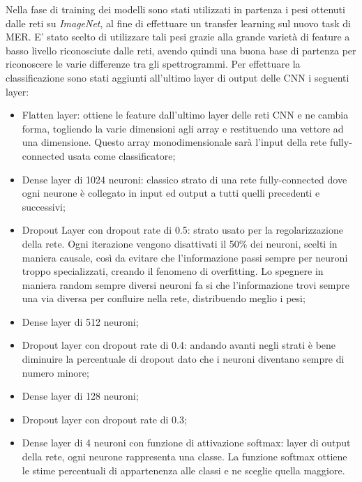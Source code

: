 \documentclass[11pt]{report}
\begin{document}
Nella fase di training dei modelli sono stati utilizzati in partenza i pesi ottenuti dalle reti su \textit{ImageNet}, al fine di effettuare un transfer learning sul nuovo task di MER. E' stato scelto di utilizzare tali pesi grazie alla grande varietà di feature a basso livello riconosciute dalle reti, avendo quindi una buona base di partenza per riconoscere le varie differenze tra gli spettrogrammi. Per effettuare la classificazione sono stati aggiunti all'ultimo layer di output delle CNN i seguenti layer:
\begin{itemize}
    \item Flatten layer: ottiene le feature dall'ultimo layer delle reti CNN e ne cambia forma, togliendo la varie dimensioni agli array e restituendo una vettore ad una dimensione. Questo array monodimensionale sarà l'input della rete fully-connected usata come classificatore;
    
    \item Dense layer di 1024 neuroni: classico strato di una rete fully-connected dove ogni neurone è collegato in input ed output a tutti quelli precedenti e successivi;
    
    \item Dropout Layer con dropout rate di 0.5: strato usato per la regolarizzazione della rete. Ogni iterazione vengono disattivati il 50\% dei neuroni, scelti in maniera causale, così da evitare che l'informazione passi sempre per neuroni troppo specializzati, creando il fenomeno di overfitting. Lo spegnere in maniera random sempre diversi neuroni fa si che l'informazione trovi sempre una via diversa per confluire nella rete, distribuendo meglio i pesi;

    \item Dense layer di 512 neuroni;
    
    \item Dropout layer con dropout rate di 0.4: andando avanti negli strati è bene diminuire la percentuale di dropout dato che i neuroni diventano sempre di numero minore;
    
    \item Dense layer di 128 neuroni;
    
    \item Dropout layer con dropout rate di 0.3;
    
    \item Dense layer di 4 neuroni con funzione di attivazione softmax: layer di output della rete, ogni neurone rappresenta una classe. La funzione softmax ottiene le stime percentuali di appartenenza alle classi e ne sceglie quella maggiore.
\end{itemize}
\end{document}
